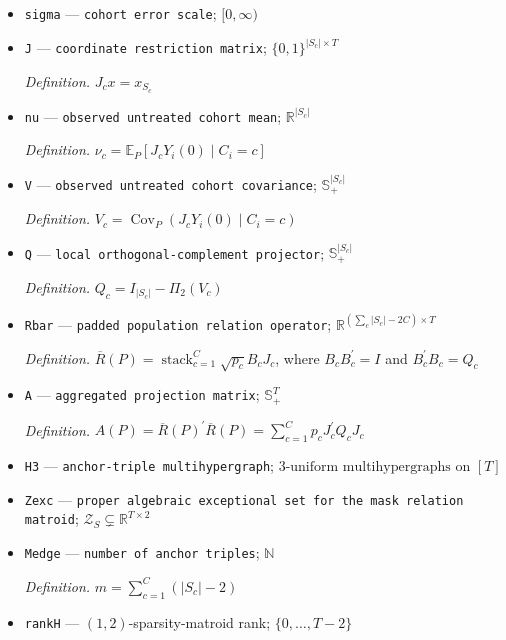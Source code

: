 \documentclass{article}
\begin{document}
\begin{itemize}
  \par\smallskip\noindent\emph{Definition.} \(H_c=\operatorname{Cov}_P(\lambda_i\mid C_i=c)\)
  \item \texttt{sigma} --- \texttt{cohort error scale}; \([0,\infty)\)
  \item \texttt{J} --- \texttt{coordinate restriction matrix}; \(\{0,1\}^{|S_c|\times T}\)
  \par\smallskip\noindent\emph{Definition.} \(J_c x=x_{S_c}\)
  \item \texttt{nu} --- \texttt{observed untreated cohort mean}; \(\mathbb R^{|S_c|}\)
  \par\smallskip\noindent\emph{Definition.} \(\nu_c=\mathbb E_P[J_cY_i(0)\mid C_i=c]\)
  \item \texttt{V} --- \texttt{observed untreated cohort covariance}; \(\mathbb S_+^{|S_c|}\)
  \par\smallskip\noindent\emph{Definition.} \(V_c=\operatorname{Cov}_P(J_cY_i(0)\mid C_i=c)\)
  \item \texttt{Q} --- \texttt{local orthogonal-\allowbreak{}complement projector}; \(\mathbb S_+^{|S_c|}\)
  \par\smallskip\noindent\emph{Definition.} \(Q_c=I_{|S_c|}-\Pi_2(V_c)\)
  \item \texttt{Rbar} --- \texttt{padded population relation operator}; \(\mathbb R^{(\sum_c |S_c|-2C)\times T}\)
  \par\smallskip\noindent\emph{Definition.} \(\overline R(P)=\operatorname{stack}_{c=1}^C\sqrt{p_c}B_cJ_c\), where \(B_cB_c^{\prime}=I\) and \(B_c^{\prime}B_c=Q_c\)
  \item \texttt{A} --- \texttt{aggregated projection matrix}; \(\mathbb S_+^T\)
  \par\smallskip\noindent\emph{Definition.} \(A(P)=\overline R(P)^{\prime}\overline R(P)=\sum_{c=1}^Cp_cJ_c^{\prime}Q_cJ_c\)
  \item \texttt{H3} --- \texttt{anchor-\allowbreak{}triple multihypergraph}; \(3\text{-uniform multihypergraphs on }[T]\)
  \item \texttt{Zexc} --- \texttt{proper algebraic exceptional set for the mask relation matroid}; \(\mathcal Z_S\subsetneq\mathbb R^{T\times2}\)
  \item \texttt{Medge} --- \texttt{number of anchor triples}; \(\mathbb N\)
  \par\smallskip\noindent\emph{Definition.} \(m=\sum_{c=1}^C(|S_c|-2)\)
  \item \texttt{rankH} --- \((1,2)\)-sparsity-matroid rank; \(\{0,\ldots,T-2\}\)

\end{itemize}
\end{document}
